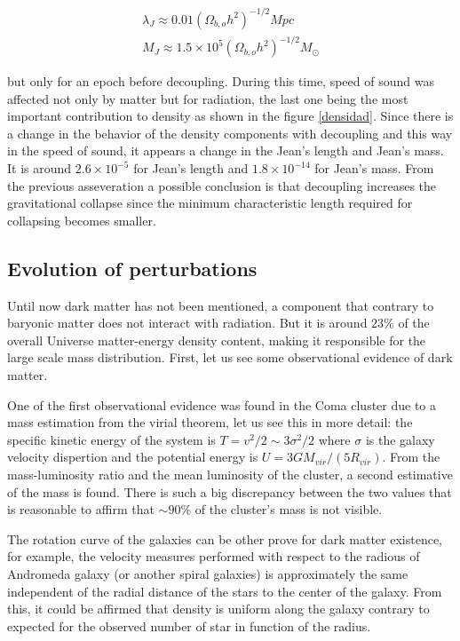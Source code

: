 \begin{eqnarray*}
\lambda_J \approx 0.01(\Omega_{b,o}h^2)^{-1/2}Mpc\\
M_J \approx 1.5\times 10^5 (\Omega_{b,o}h^2)^{-1/2}M_{\odot}
\end{eqnarray*}

but only for an epoch before decoupling. During this time, 
speed of sound was affected not only by matter but for radiation, 
the last one being the most important contribution to density as 
shown in the figure \ref{densidad}. 
Since there is a change in the 
behavior of the density components with decoupling and this way in the
speed of sound, it appears a change in the Jean's length and Jean's mass.
It is around $2.6\times 10^{-5}$ for Jean's length  and $1.8\times 10^{-14}$
for Jean's mass. 
From the previous asseveration a possible conclusion is that
decoupling increases the gravitational collapse since the minimum characteristic length
required for collapsing becomes smaller.

\subsection{ Evolution of perturbations }

Until now dark matter has not been mentioned, a component that contrary
to baryonic matter does not interact with radiation. But it is around
$23\%$ of the overall Universe matter-energy density content, making it responsible for the 
large scale mass distribution. First, let us see some observational evidence of dark matter. 

One of the first observational evidence was found in the Coma cluster due to
a mass estimation from the virial theorem, let us see this in more detail: 
the specific kinetic energy of the system is $T = v^2/2 \sim 3\sigma^2/2 $ 
where $\sigma$ is the galaxy velocity dispertion and the potential energy
is $U = 3GM_{vir}/(5R_{vir})$. From the mass-luminosity ratio and the 
mean luminosity of the cluster, a second estimative of the mass is found. There is
such a big discrepancy between the two values that is reasonable to affirm that $\sim 90\%$ of the 
cluster's mass is not visible. 

The rotation curve of the galaxies can be other prove for dark matter existence,
for example, the velocity measures performed with respect to the radious of Andromeda 
galaxy (or another spiral galaxies) is approximately the same independent of the radial
distance of the stars to the center of the galaxy. From this, it could be affirmed that
density is uniform along the galaxy contrary to expected for the observed 
number of star in function of the radius. 


